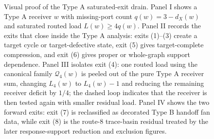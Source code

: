 \documentclass[11pt]{article}
\begin{document}
\begin{figure}[t]
{%
}
\caption[Visual proof of the Type A saturated-exit drain]{Visual proof of the Type A saturated-exit drain.  Panel I shows a Type A receiver \(w\) with missing-port count \(q(w)=3-d_X(w)\) and saturated routed load \(L(w)\ge4q(w)\).  Panel II records the exits that close inside the Type A analysis: exits (1)--(3) create a target cycle or target-defective state, exit (5) gives target-complete compression, and exit (6) gives proper or whole-graph support dependence.  Panel III isolates exit (4): one routed load using the canonical family \(\mathcal Q_4(w)\) is peeled out of the pure Type A receiver sum, changing \(L_4(w)\) to \(L_4(w)-1\) and reducing the remaining receiver deficit by \(1/4\); the dashed loop indicates that the receiver is then tested again with smaller residual load.  Panel IV shows the two forward exits: exit (7) is reclassified as decorated Type B handoff fan data, while exit (8) is the route-8 trace-basin residual treated by the later response-support reduction and exclusion figures.}
\label{fig:typeA-saturated-exit-drain}
\end{figure}
\end{document}
